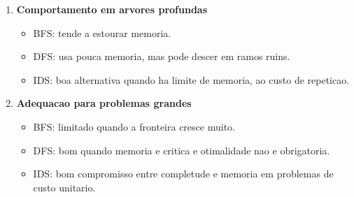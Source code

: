 \begin{enumerate}[label=\alph*)]
  \item \textbf{Comportamento em arvores profundas}
  \begin{itemize}[leftmargin=1.5em]
    \item BFS: tende a estourar memoria.
    \item DFS: usa pouca memoria, mas pode descer em ramos ruins.
    \item IDS: boa alternativa quando ha limite de memoria, ao custo de repeticao.
  \end{itemize}

  \item \textbf{Adequacao para problemas grandes}
  \begin{itemize}[leftmargin=1.5em]
    \item BFS: limitado quando a fronteira cresce muito.
    \item DFS: bom quando memoria e critica e otimalidade nao e obrigatoria.
    \item IDS: bom compromisso entre completude e memoria em problemas de custo unitario.
  \end{itemize}
\end{enumerate}
